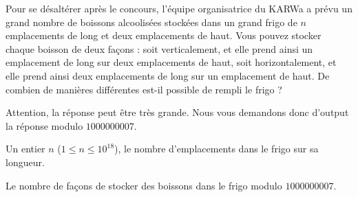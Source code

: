 \problemname{\problemyamlname}


Pour se désaltérer après le concours, l'équipe organisatrice du KARWa a prévu un grand
nombre de boissons alcoolisées stockées dans un grand frigo de $n$ emplacements
de long et deux emplacements de haut. Vous pouvez stocker chaque boisson de
deux façons : soit verticalement, et elle prend ainsi un emplacement de long sur
deux emplacements de haut, soit horizontalement, et elle prend ainsi deux
emplacements de long sur un emplacement de haut. De combien de manières
différentes est-il possible de rempli le frigo ? 

Attention, la réponse peut être très grande. Nous vous demandons donc d'output
la réponse modulo $1000000007$.

\begin{Input}
	Un entier $n$ ($1 \le n \le 10^18$), le nombre d'emplacements dans le frigo sur sa longueur.
\end{Input}

\begin{Output}
	Le nombre de façons de stocker des boissons dans le frigo modulo $1000000007$.
\end{Output}
